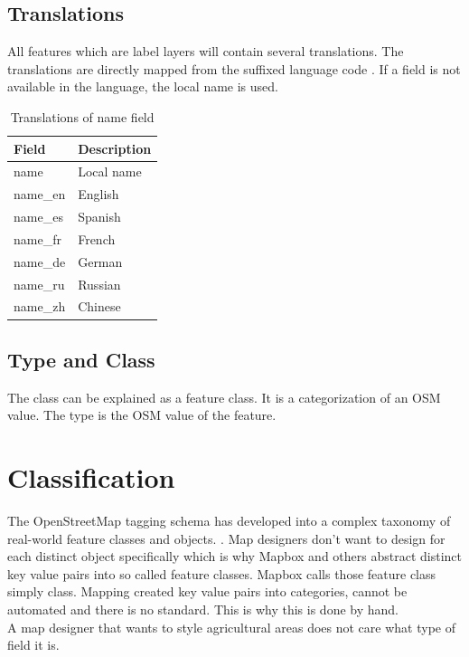 \subsection{Translations}
All features which are label layers will contain several translations.
The translations are directly mapped from the suffixed language code \cite{83_wiki.openstreetmap.org_2015}. If a field is not available in the language, the local name is used.

\begin{table}[H]
\centering
    \begin{tabular}{ll}
    \hline
     Field    & 	Description                                    \\
    \hline
    name      & Local name  \\
    name\_en	 & English                          \\
    name\_es	 & Spanish                          \\
    name\_fr	 & French                           \\
    name\_de	 & German                           \\
    name\_ru	 & Russian                          \\
    name\_zh	 & Chinese                          \\
    \end{tabular}
    \caption{Translations of name field}
\end{table}

\subsection{Type and Class}
The class can be explained as a feature class. It is a categorization of an OSM value.
The type is the OSM value of the feature.

\section{Classification}
\label{classification}

The OpenStreetMap tagging schema has developed into a complex taxonomy of real-world feature classes and objects. \cite[p. 15]{haklay2008openstreetmap}. Map designers don't want to design
for each distinct object specifically which is why Mapbox and others abstract distinct key value pairs into so called feature classes. Mapbox calls those feature class simply class. Mapping created key value pairs into categories, cannot be automated
and there is no standard. This is why this is done by hand.
\\
A map designer that wants to style agricultural areas does not care
what type of field it is.

